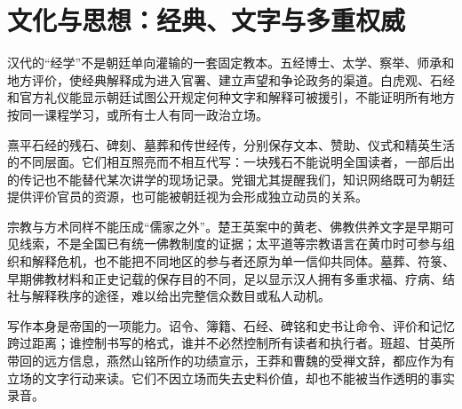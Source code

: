 \section{文化与思想：经典、文字与多重权威}

汉代的“经学”不是朝廷单向灌输的一套固定教本。五经博士、太学、察举、师承和地方评价，使经典解释成为进入官署、建立声望和争论政务的渠道。白虎观、石经和官方礼仪能显示朝廷试图公开规定何种文字和解释可被援引，不能证明所有地方按同一课程学习，或所有士人有同一政治立场。

熹平石经的残石、碑刻、墓葬和传世经传，分别保存文本、赞助、仪式和精英生活的不同层面。它们相互照亮而不相互代写：一块残石不能说明全国读者，一部后出的传记也不能替代某次讲学的现场记录。党锢尤其提醒我们，知识网络既可为朝廷提供评价官员的资源，也可能被朝廷视为会形成独立动员的关系。

宗教与方术同样不能压成“儒家之外”。楚王英案中的黄老、佛教供养文字是早期可见线索，不是全国已有统一佛教制度的证据；太平道等宗教语言在黄巾时可参与组织和解释危机，也不能把不同地区的参与者还原为单一信仰共同体。墓葬、符箓、早期佛教材料和正史记载的保存目的不同，足以显示汉人拥有多重求福、疗病、结社与解释秩序的途径，难以给出完整信众数目或私人动机。

写作本身是帝国的一项能力。诏令、簿籍、石经、碑铭和史书让命令、评价和记忆跨过距离；谁控制书写的格式，谁并不必然控制所有读者和执行者。班超、甘英所带回的远方信息，燕然山铭所作的功绩宣示，王莽和曹魏的受禅文辞，都应作为有立场的文字行动来读。它们不因立场而失去史料价值，却也不能被当作透明的事实录音。
